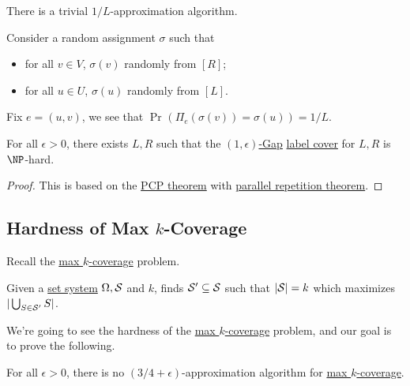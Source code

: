 \begin{remark}[Baseline]
	There is a trivial \(1/L\)-approximation algorithm.
\end{remark}
\begin{explanation}
	Consider a random assignment \(\sigma \) such that
	\begin{itemize}
		\item for all \(v\in V\), \(\sigma (v)\) randomly from \([R]\);
		\item for all \(u\in U\), \(\sigma (u)\) randomly from \([L]\).
	\end{itemize}
	Fix \(e=(u, v)\), we see that \(\Pr_{}(\Pi _e(\sigma (v)) = \sigma (u)) = 1 / L \).
\end{explanation}

\begin{theorem}
	For all \(\epsilon > 0\), there exists \(L, R\) such that the \hyperref[def:c-s-Gap]{\((1, \epsilon )\)-Gap} \hyperref[prb:label-cover]{label cover} for \(L, R\) is \(\NP\)-hard.
\end{theorem}
\begin{proof}
	This is based on the \hyperref[thm:PCP]{PCP theorem} with \href{https://www.wisdom.weizmann.ac.il/~/ranraz/publications/Pparrepsur.pdf}{parallel repetition theorem}.
\end{proof}

\subsection{Hardness of Max \(k\)-Coverage}
Recall the \hyperref[prb:max-k-coverage]{max \(k\)-coverage} problem.

\begin{problem}\label{prb:max-k-coverage}
Given a \hyperref[def:set-system]{set system} \(\Omega , \mathcal{\MakeUppercase{s}} \) and \(k\), finds \(\mathcal{\MakeUppercase{s}} ^\prime \subseteq \mathcal{\MakeUppercase{s}} \) such that \(\vert \mathcal{\MakeUppercase{s}}  \vert = k\) which maximizes \(\vert \bigcup_{S\in \mathcal{\MakeUppercase{S}} ^\prime } S \vert \).
\end{problem}

We're going to see the hardness of the \hyperref[prb:max-k-coverage]{max \(k\)-coverage} problem, and our goal is to prove the following.

\begin{theorem}\label{thm:max-k-coverage}
	For all \(\epsilon >0\), there is no \((3 / 4 + \epsilon )\)-approximation algorithm for \hyperref[prb:max-k-coverage]{max \(k\)-coverage}.
\end{theorem}


